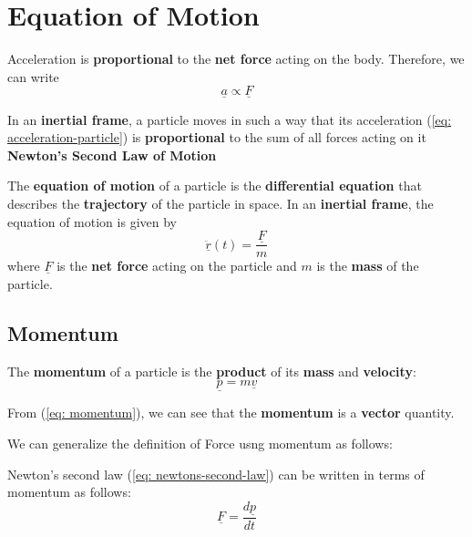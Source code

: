 \section{Equation of Motion}
\begin{note}
	Acceleration is {\bf proportional} to the {\bf net force} acting on the body. Therefore, we can write
	$$\underline{a} \propto \underline{F}$$

	In an {\bf inertial frame}, a particle moves  in such a way that its acceleration (\ref{eq: acceleration-particle}) is {\bf proportional} to the sum of all forces acting on it {\bf Newton's Second Law of Motion}
\end{note}

\begin{definition}
	The {\bf equation of motion} of a particle is the {\bf differential equation} that describes the {\bf trajectory} of the particle in space. In an {\bf inertial frame}, the equation of motion is given by
	\begin{equation}
		\label{eq: equation-of-motion}
		\underline{\ddot{r}}(t) = \frac{\underline{F}}{m}
	\end{equation}
	where $\underline{F}$ is the {\bf net force} acting on the particle and $m$ is the {\bf mass} of the particle.
\end{definition}

\clearpage
\subsection{Momentum}
\begin{definition}[Momentum]
	The {\bf momentum} of a particle is the {\bf product} of its {\bf mass} and {\bf velocity}:
	\begin{equation}
		\label{eq: momentum}
		\underline{p} = m\underline{v}
	\end{equation}
\end{definition}

\begin{note}
	From (\ref{eq: momentum}), we can see that the {\bf momentum} is a {\bf vector} quantity.
\end{note}

We can generalize the definition of Force usng momentum as follows:
\begin{definition}
	Newton's second law (\ref{eq: newtons-second-law}) can be written in terms of momentum as follows:
	\begin{equation}
		\label{eq: newtons-second-law-momentum}
		\underline{F} = \frac{d\underline{p}}{dt}
	\end{equation}
\end{definition}

